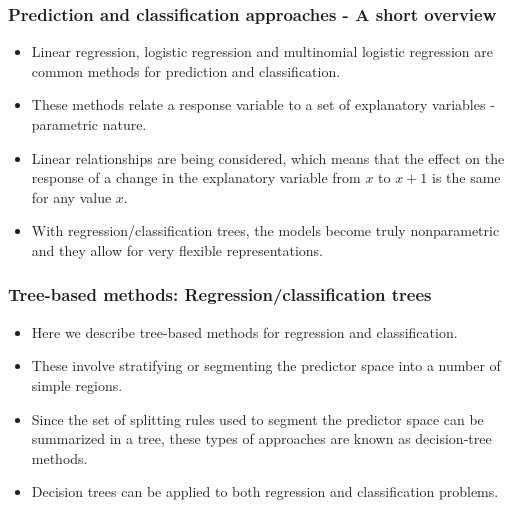\documentclass{beamer}
\begin{document}
\begin{frame}\frametitle{Prediction and classification approaches - A short overview}
	\begin{itemize}
	  \item Linear regression, logistic regression and multinomial logistic regression are common methods for prediction and classification.
	  	\vspace*{0.2cm}
	  \item These methods relate a response
variable to a set of explanatory variables - parametric nature.
\vspace*{0.2cm}
\item Linear relationships are being considered, which
means that the effect on the response of a change in the explanatory variable from
$x$ to $x+1$ is the same for any value $x$.
\vspace*{0.2cm}
\item With regression/classification trees, the models become truly nonparametric and they allow for very flexible representations.
	\end{itemize}
\end{frame}

\begin{frame}\frametitle{Tree-based methods: Regression/classification trees}
	\begin{itemize}
	  \item Here we describe tree-based methods for regression and
classification.
\vspace*{0.2cm}
\item These involve stratifying or segmenting the predictor space
into a number of simple regions.
\vspace*{0.2cm}
\item Since the set of splitting rules used to segment the
predictor space can be summarized in a tree, these types of
approaches are known as decision-tree methods.
\vspace*{0.2cm}
\item Decision trees can be applied to both regression and
classification problems.
	\end{itemize}
\end{frame}
\end{document}
